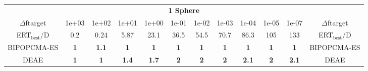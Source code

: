 \begin{tabular}{cccccccccccc}
 & \multicolumn{10}{c}{{\normalsize \textbf{1 Sphere}}}\\
$\Delta$ftarget& 1e+03& 1e+02& 1e+01& 1e+00& 1e-01& 1e-02& 1e-03& 1e-04& 1e-05& 1e-07 & $\Delta$ftarget \\
ERT$_{\textrm{best}}$/D& 0.2& 0.24& 5.87& 23.1& 36.5& 54.5& 70.7& 86.3& 105& 133 & ERT$_{\textrm{best}}$/D \\
\hline
BIPOPCMA-ES & \textbf{1} & \textbf{1.1} & \textbf{1} & \textbf{1} & \textbf{1} & \textbf{1} & \textbf{1} & \textbf{1} & \textbf{1} & \textbf{1} & BIPOPCMA-ES \cite{add_an_entry_for_BIPOPCMA-ES_in_bbob.bib}\\
DEAE & \textbf{1} & \textbf{1} & \textbf{1.4} & \textbf{1.7} & \textbf{2} & \textbf{2} & \textbf{2} & \textbf{2.1} & \textbf{2} & \textbf{2.1} & DEAE \cite{add_an_entry_for_DEAE_in_bbob.bib}
\end{tabular}
